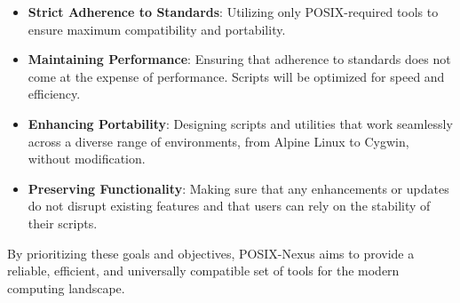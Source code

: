 \begin{itemize} 
    \item \textbf{Strict Adherence to Standards}: Utilizing only POSIX-required tools to ensure maximum compatibility and portability. 
    \item \textbf{Maintaining Performance}: Ensuring that adherence to standards does not come at the expense of performance. Scripts will be optimized for speed and efficiency. 
    \item \textbf{Enhancing Portability}: Designing scripts and utilities that work seamlessly across a diverse range of environments, from Alpine Linux to Cygwin, without modification. 
    \item \textbf{Preserving Functionality}: Making sure that any enhancements or updates do not disrupt existing features and that users can rely on the stability of their scripts. 
\end{itemize}

By prioritizing these goals and objectives, POSIX-Nexus aims to provide a reliable, efficient, and universally compatible set of tools for the modern computing landscape.
